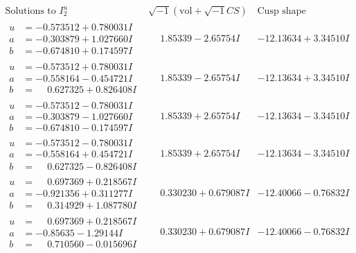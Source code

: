 \documentclass[1p]{elsarticle_modified}
\theoremstyle{definition}
\newcommand{\I}{\sqrt{-1}}
\begin{document}
$$\begin{array}{c|c|c}  
\text{Solutions to }I^u_{2}& \I (\text{vol} + \sqrt{-1}CS) & \text{Cusp shape}\\
 \hline 
\begin{aligned}
u &= -0.573512 + 0.780031 I \\
a &= -0.303879 + 1.027660 I \\
b &= -0.674810 + 0.174597 I\end{aligned}
 & \phantom{-}1.85339 - 2.65754 I & -12.13634 + 3.34510 I \\ \hline\begin{aligned}
u &= -0.573512 + 0.780031 I \\
a &= -0.558164 - 0.454721 I \\
b &= \phantom{-}0.627325 + 0.826408 I\end{aligned}
 & \phantom{-}1.85339 - 2.65754 I & -12.13634 + 3.34510 I \\ \hline\begin{aligned}
u &= -0.573512 - 0.780031 I \\
a &= -0.303879 - 1.027660 I \\
b &= -0.674810 - 0.174597 I\end{aligned}
 & \phantom{-}1.85339 + 2.65754 I & -12.13634 - 3.34510 I \\ \hline\begin{aligned}
u &= -0.573512 - 0.780031 I \\
a &= -0.558164 + 0.454721 I \\
b &= \phantom{-}0.627325 - 0.826408 I\end{aligned}
 & \phantom{-}1.85339 + 2.65754 I & -12.13634 - 3.34510 I \\ \hline\begin{aligned}
u &= \phantom{-}0.697369 + 0.218567 I \\
a &= -0.921356 + 0.311277 I \\
b &= \phantom{-}0.314929 + 1.087780 I\end{aligned}
 & \phantom{-}0.330230 + 0.679087 I & -12.40066 - 0.76832 I \\ \hline\begin{aligned}
u &= \phantom{-}0.697369 + 0.218567 I \\
a &= -0.85635 - 1.29144 I \\
b &= \phantom{-}0.710560 - 0.015696 I\end{aligned}
 & \phantom{-}0.330230 + 0.679087 I & -12.40066 - 0.76832 I \\ \hline\begin{aligned}

\end{aligned}
\end{array}$$
\end{document}
